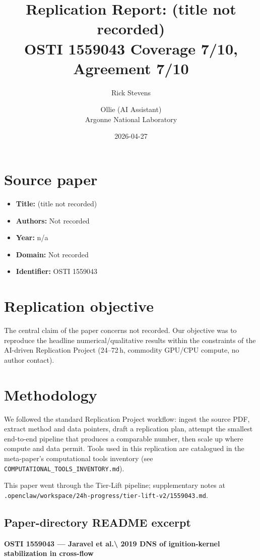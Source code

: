 \documentclass[11pt]{article}
\title{Replication Report: (title not recorded)\\[2pt]\large OSTI 1559043 \textbar{} Coverage 7/10, Agreement 7/10}
\author{Rick Stevens \and Ollie (AI Assistant)\\\small Argonne National Laboratory}
\date{2026-04-27}
\begin{document}
\maketitle

\section{Source paper}
\begin{itemize}
\item \textbf{Title:} (title not recorded)
\item \textbf{Authors:} Not recorded
\item \textbf{Year:} n/a
\item \textbf{Domain:} Not recorded
\item \textbf{Identifier:} OSTI 1559043
\end{itemize}


\section{Replication objective}
The central claim of the paper concerns not recorded. Our objective was to reproduce the headline numerical/qualitative results within the constraints of the AI-driven Replication Project (24--72\,h, commodity GPU/CPU compute, no author contact). 

\section{Methodology}
We followed the standard Replication Project workflow: ingest the source PDF, extract method and data pointers, draft a replication plan, attempt the smallest end-to-end pipeline that produces a comparable number, then scale up where compute and data permit. Tools used in this replication are catalogued in the meta-paper's computational tools inventory (see \texttt{COMPUTATIONAL\_TOOLS\_INVENTORY.md}).

This paper went through the Tier-Lift pipeline; supplementary notes at \texttt{.openclaw/workspace/24h-progress/tier-lift-v2/1559043.md}.

\subsection*{Paper-directory README excerpt}
\small
\par\medskip\textbf{OSTI 1559043 — Jaravel et al.\textbackslash{} 2019 DNS of ignition-kernel stabilization in cross-flow}\par
\end{document}
